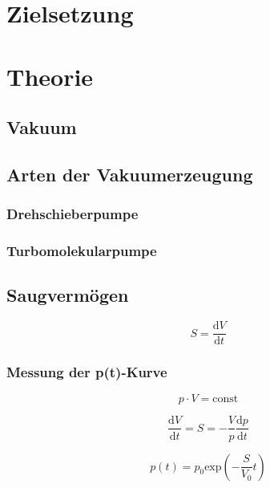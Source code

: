 \section{Zielsetzung}

\section{Theorie}
	
	\subsection{Vakuum}

	\subsection{Arten der Vakuumerzeugung}

		\subsubsection{Drehschieberpumpe}

		\subsubsection{Turbomolekularpumpe}

	\subsection{Saugvermögen}

		\begin{equation}
			S = \frac{\text{d}V}{\text{d}t}
		\end{equation}

		\subsubsection{Messung der p(t)-Kurve}

			\begin{equation}
				p \cdot V = \text{const}
			\end{equation}

			\begin{equation}
				\frac{\text{d}V}{\text{d}t} = S = - \frac{V}{p} \frac{\text{d}p}{\text{d}t}
			\end{equation}

			\begin{equation}
				p(t) = p_0 \text{exp}\left( - \frac{S}{V_0}t \right)
			\end{equation}
				
